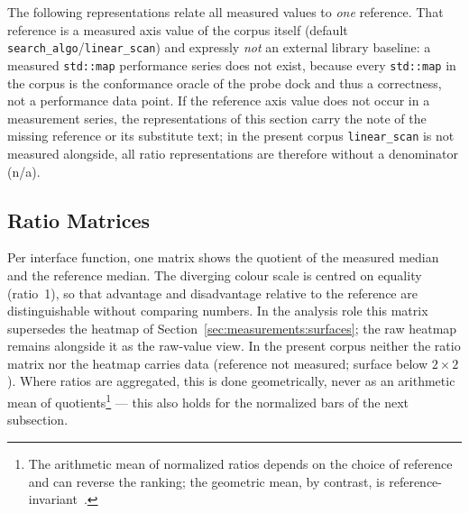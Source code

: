 The following representations relate all measured values to \emph{one} reference. That reference is
a measured axis value of the corpus itself (default \texttt{search\_algo}/\texttt{linear\_scan})
and expressly \emph{not} an external library baseline: a measured \texttt{std::map} performance
series does not exist, because every \texttt{std::map} in the corpus is the conformance oracle of
the probe dock and thus a correctness, not a performance data point. If the reference axis value
does not occur in a measurement series, the representations of this section carry the note of the
missing reference or its substitute text; in the present corpus \texttt{linear\_scan} is not
measured alongside, all ratio representations are therefore without a denominator (n/a).

\subsection{Ratio Matrices}\label{sec:measurements:ratio-matrices}

Per interface function, one matrix shows the quotient of the measured median and the reference
median. The diverging colour scale is centred on equality (ratio~1), so that advantage and
disadvantage relative to the reference are distinguishable without comparing numbers. In the
analysis role this matrix supersedes the heatmap of Section~\ref{sec:measurements:surfaces}; the raw
heatmap remains alongside it as the raw-value view. In the present corpus neither the ratio matrix
nor the heatmap carries data (reference not measured; surface below $2{\times}2$). Where ratios
are aggregated, this is done geometrically, never as an arithmetic mean of
quotients\footnote{The arithmetic mean of normalized ratios depends on the choice of reference and
can reverse the ranking; the geometric mean, by contrast, is
reference-invariant~\cite{fleming1986statistics}.} --- this also holds for the normalized bars of
the next subsection.

